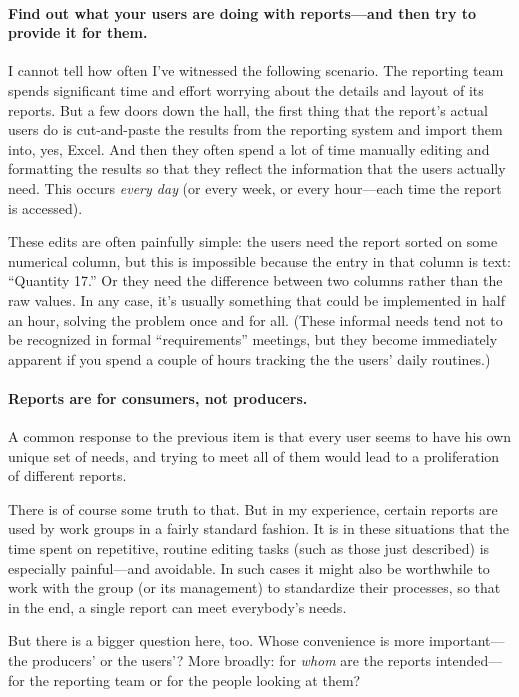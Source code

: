 \paragraph{Find out what your users are doing with reports---and then try to provide it
for them.} I cannot tell how often I've witnessed the following scenario. The
reporting team spends significant time and effort worrying about the
details and layout of its reports. But a few doors down the hall, the
first thing that the report's actual users do is cut-and-paste the
results from the reporting system and import them into, yes, Excel.
And then they often spend a lot of time manually editing and
formatting the results so that they reflect the information that the
users actually need. This occurs \emph{every day} (or every week, or
every hour---each time the report is accessed).

These edits are often painfully simple: the users need the report
sorted on some numerical column, but this is impossible because the
entry in that column is text: ``Quantity 17.'' Or they need the
difference between two columns rather than the raw values.  In any
case, it's usually something that could be implemented in half an
hour, solving the problem once and for all. (These informal needs tend
not to be recognized in formal ``requirements'' meetings, but they
become immediately apparent if you spend a couple of hours tracking
the the users' daily routines.)

\paragraph{Reports are for consumers, not producers.}
A common response to the previous item is that every user seems to
have his own unique set of needs, and trying to meet all of them would
lead to a proliferation of different reports.

There is of course some truth to that. But in my experience, certain
reports are used by work groups in a fairly standard fashion. It
is in these situations that the time spent on repetitive, routine editing
tasks\vadjust{\vfill\pagebreak} (such as those just described) is especially painful---and
avoidable.  In such cases it might also be worthwhile to work with the
group (or its management) to standardize their processes, so that in
the end, a single report can meet everybody's needs.

But there is a bigger question here, too. Whose convenience is more
important---the producers' or the users'? More broadly: for
\emph{whom} are the reports intended---for the reporting team or for
the people looking at them?

